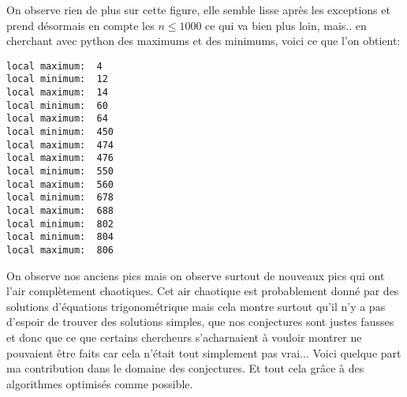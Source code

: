 On observe rien de plus sur cette figure, elle semble lisse après les exceptions et prend désormais en compte les $n \leq 1000$ ce qui va bien plus loin, mais.. en cherchant avec python des maximums et des minimums, voici ce que l'on obtient:

\begin{verbatim}
local maximum:  4
local minimum:  12
local maximum:  14
local minimum:  60
local maximum:  64
local minimum:  450
local maximum:  474
local maximum:  476
local minimum:  550
local maximum:  560
local minimum:  678
local maximum:  688
local minimum:  802
local minimum:  804
local maximum:  806
\end{verbatim}

On observe nos anciens pics mais on observe surtout de nouveaux pics qui ont l'air complètement chaotiques. Cet air chaotique est probablement donné par des solutions d'équations trigonométrique mais cela montre surtout qu'il n'y a pas d'espoir de trouver des solutions simples, que nos conjectures sont justes fausses et donc que ce que certains chercheurs s'acharnaient à vouloir montrer ne pouvaient être faits car cela n'était tout simplement pas vrai... Voici quelque part ma contribution dans le domaine des conjectures. Et tout cela grâce à des algorithmes optimisés comme possible.
